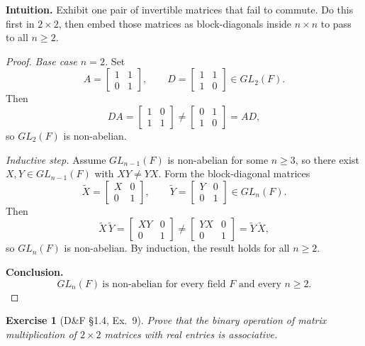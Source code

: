 \documentclass[12pt]{article}
\newtheorem{exercise}[theorem]{Exercise}
\theoremstyle{definition}
\begin{document}
\dotfill

\noindent\textbf{Intuition.}
Exhibit one pair of invertible matrices that fail to commute. Do this first in $2\times2$,
then embed those matrices as block-diagonals inside $n\times n$ to pass to all $n\ge2$.

\dotfill

\begin{proof}
\emph{Base case $n=2$.}
Set
\[
A=\begin{bmatrix}1&1\\ 0&1\end{bmatrix},\qquad
D=\begin{bmatrix}1&1\\ 1&0\end{bmatrix}\in GL_2(F).
\]
Then
\[
DA=\begin{bmatrix}1&0\\ 1&1\end{bmatrix}\neq
\begin{bmatrix}0&1\\ 1&0\end{bmatrix}=AD,
\]
so $GL_2(F)$ is non-abelian.

\smallskip
\emph{Inductive step.}
Assume $GL_{n-1}(F)$ is non-abelian for some $n\ge3$, so there exist
$X,Y\in GL_{n-1}(F)$ with $XY\ne YX$.
Form the block-diagonal matrices
\[
\widetilde X=\begin{bmatrix}X&0\\ 0&1\end{bmatrix},\qquad
\widetilde Y=\begin{bmatrix}Y&0\\ 0&1\end{bmatrix}\in GL_n(F).
\]
Then
\[
\widetilde X\,\widetilde Y=\begin{bmatrix}XY&0\\ 0&1\end{bmatrix}\neq
\begin{bmatrix}YX&0\\ 0&1\end{bmatrix}=\widetilde Y\,\widetilde X,
\]
so $GL_n(F)$ is non-abelian. By induction, the result holds for all $n\ge2$.

\smallskip
\noindent\textbf{Conclusion.}
\[
\boxed{GL_n(F)\ \text{is non-abelian for every field }F\text{ and every }n\ge2.}
\]
\end{proof}

\newpage

\begin{exercise}[D\&F §1.4, Ex.~9]
Prove that the binary operation of matrix multiplication of $2\times2$ matrices with real entries is associative.
\end{exercise}
\end{document}
